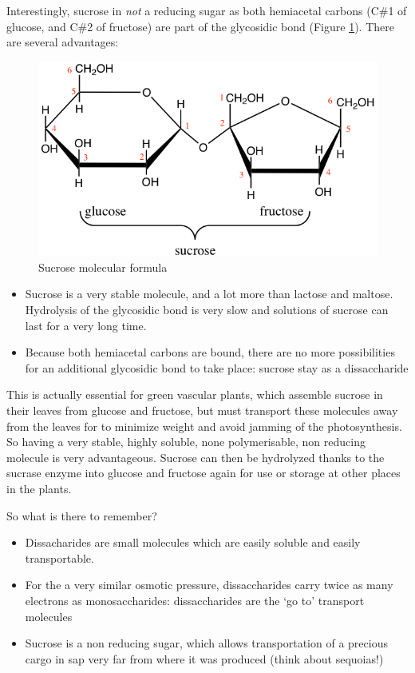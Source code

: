 \documentclass[]{book}
\providecommand{\tightlist}{%
  \setlength{\itemsep}{0pt}\setlength{\parskip}{0pt}}
\theoremstyle{definition}
\theoremstyle{definition}
\theoremstyle{definition}
\theoremstyle{remark}
\begin{document}
Interestingly, sucrose in \emph{not} a reducing sugar as both hemiacetal
carbons (C\#1 of glucose, and C\#2 of fructose) are part of the
glycosidic bond (Figure \ref{fig:sucrose}). There are several
advantages:

\begin{figure}

{\centering \includegraphics[width=0.48\linewidth]{pictures/sucrose} 

}

\caption{Sucrose molecular formula}\label{fig:sucrose}
\end{figure}

\begin{itemize}
\tightlist
\item
  Sucrose is a very stable molecule, and a lot more than lactose and
  maltose. Hydrolysis of the glycosidic bond is very slow and solutions
  of sucrose can last for a very long time.
\item
  Because both hemiacetal carbons are bound, there are no more
  possibilities for an additional glycosidic bond to take place: sucrose
  stay as a dissaccharide
\end{itemize}

This is actually essential for green vascular plants, which assemble
sucrose in their leaves from glucose and fructose, but must transport
these molecules away from the leaves for to minimize weight and avoid
jamming of the photosynthesis. So having a very stable, highly soluble,
none polymerisable, non reducing molecule is very advantageous. Sucrose
can then be hydrolyzed thanks to the sucrase enzyme into glucose and
fructose again for use or storage at other places in the plants.

So what is there to remember?

\begin{itemize}
\tightlist
\item
  Dissacharides are small molecules which are easily soluble and easily
  transportable.
\item
  For the a very similar osmotic pressure, dissaccharides carry twice as
  many electrons as monosaccharides: dissaccharides are the `go to'
  transport molecules
\item
  Sucrose is a non reducing sugar, which allows transportation of a
  precious cargo in sap very far from where it was produced (think about
  sequoias!)
\end{itemize}
\end{document}
